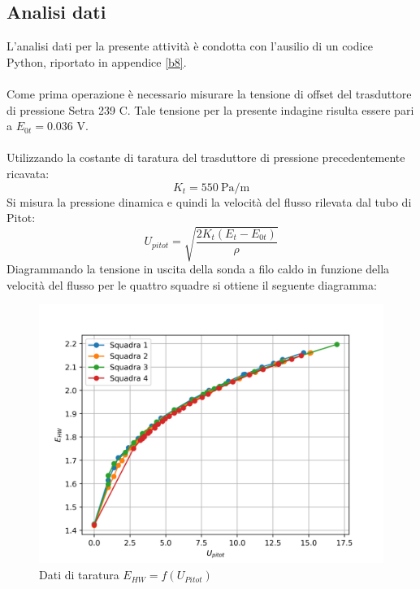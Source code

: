 \subsection{Analisi dati}
L'analisi dati per la presente attività è condotta con l'ausilio di un codice Python, riportato in appendice \ref{b8}.\\\\
Come prima operazione è necessario misurare la tensione di offset del trasduttore di pressione Setra 239 C. Tale tensione per la presente indagine risulta essere pari a $E_{0t}=0.036$ V.\\\\
Utilizzando la costante di taratura del trasduttore di pressione precedentemente ricavata:
\begin{equation*}
    K_t = 550\ \text{Pa/m}
\end{equation*}
Si misura la pressione dinamica e quindi la velocità del flusso rilevata dal tubo di Pitot:
\begin{equation*}
    U_{pitot} = \sqrt{\frac{2K_t(E_{t}-E_{0t})}\rho}
\end{equation*}
Diagrammando la tensione in uscita della sonda a filo caldo in funzione della velocità del flusso per le quattro squadre si ottiene il seguente diagramma:
\begin{figure}[H]
    \centering
    \includegraphics[width=.8\textwidth]{images/8/rawdata.png}
    \caption{Dati di taratura $E_{HW}=f(U_{Pitot})$}
\end{figure}

